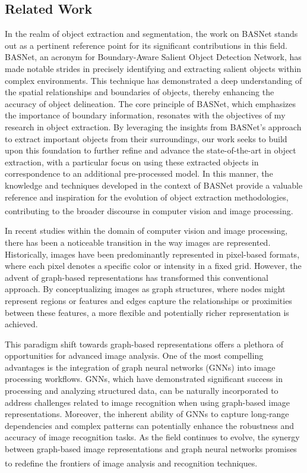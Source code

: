 \documentclass[letter,10pt]{article}
\begin{document}
\begin{multicols}{2}
		\section{Related Work}
		In the realm of object extraction and segmentation, the work on BASNet stands out as a pertinent reference point for its significant contributions in this field. BASNet, an acronym for Boundary-Aware Salient Object Detection Network, has made notable strides in precisely identifying and extracting salient objects within complex environments. This technique has demonstrated a deep understanding of the spatial relationships and boundaries of objects, thereby enhancing the accuracy of object delineation. The core principle of BASNet, which emphasizes the importance of boundary information, resonates with the objectives of my research in object extraction. By leveraging the insights from BASNet's approach to extract important objects from their surroundings, our work seeks to build upon this foundation to further refine and advance the state-of-the-art in object extraction, with a particular focus on using these extracted objects in correspondence to an additional pre-processed model. In this manner, the knowledge and techniques developed in the context of BASNet provide a valuable reference and inspiration for the evolution of object extraction methodologies, contributing to the broader discourse in computer vision and image processing.\textsuperscript{\cite{basnet}}
        \par
        In recent studies within the domain of computer vision and image processing, there has been a noticeable transition in the way images are represented. Historically, images have been predominantly represented in pixel-based formats, where each pixel denotes a specific color or intensity in a fixed grid. However, the advent of graph-based representations has transformed this conventional approach. By conceptualizing images as graph structures, where nodes might represent regions or features and edges capture the relationships or proximities between these features, a more flexible and potentially richer representation is achieved.
        \par
        This paradigm shift towards graph-based representations offers a plethora of opportunities for advanced image analysis. One of the most compelling advantages is the integration of graph neural networks (GNNs) into image processing workflows. GNNs, which have demonstrated significant success in processing and analyzing structured data, can be naturally incorporated to address challenges related to image recognition when using graph-based image representations. Moreover, the inherent ability of GNNs to capture long-range dependencies and complex patterns can potentially enhance the robustness and accuracy of image recognition tasks. As the field continues to evolve, the synergy between graph-based image representations and graph neural networks promises to redefine the frontiers of image analysis and recognition techniques\textsuperscript{\cite{imagematch}}.
		

\end{multicols}
\end{document}
